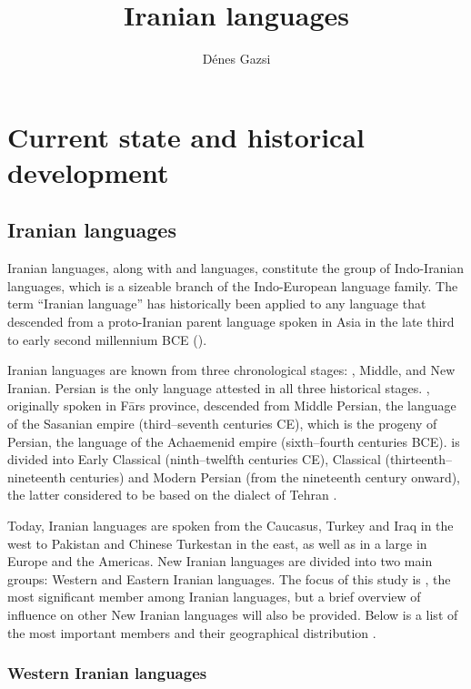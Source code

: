 \documentclass[output=paper]{langsci/langscibook}
\author{Dénes Gazsi}
\title{Iranian languages}
\begin{document}
\maketitle

\section{Current state and historical development}

\subsection{Iranian languages}

Iranian languages, along with  and  languages, constitute the group of Indo-Iranian languages, which is a sizeable branch of the Indo-European language family. The term ``Iranian language'' has historically been applied to any language that descended from a proto-Iranian parent language spoken in  Asia in the late third to early second millennium BCE (\citealt{Skjærvø2012}).

Iranian languages are known from three chronological stages: , Middle, and New Iranian. Persian is the only language attested in all three historical stages. , originally spoken in Fārs province, descended from Middle Persian, the language of the Sasanian empire (third–seventh centuries CE), which is the progeny of  Persian, the language of the Achaemenid empire (sixth–fourth centuries BCE).  is divided into Early {Classical} (ninth–twelfth centuries CE), {Classical} (thirteenth–nineteenth centuries) and Modern Persian (from the nineteenth century onward), the latter considered to be based on the dialect of Tehran \citep[427]{Jeremiás2003}.

Today, Iranian languages are spoken from the Caucasus, Turkey and Iraq in the west to Pakistan and Chinese Turkestan in the east, as well as in a large  in Europe and the Americas. New Iranian languages are divided into two main groups: {Western} and {Eastern} Iranian languages. The focus of this study is , the most significant member among Iranian languages, but a brief overview of  influence on other New Iranian languages will also be provided. Below is a list of the most important members and their geographical distribution \citep[246]{Schmitt1989}.


\subsubsection{Western Iranian languages}
\end{document}
